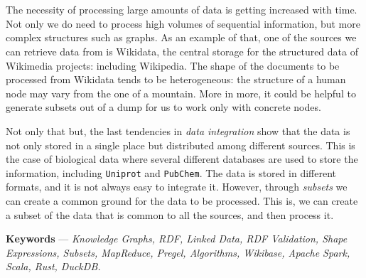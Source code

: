 \newenvironment{abstract}%
{\cleardoublepage\null\vfill\section*{\abstractname}}%
{\vfill\null}
\begin{abstract}
    The necessity of processing large amounts of data is getting increased with time. Not only we do need to process high volumes of sequential information, but more complex structures such as graphs. As an example of that, one of the sources we can retrieve data from is Wikidata, the central storage for the structured data of Wikimedia projects: including Wikipedia. The shape of the documents to be processed from Wikidata tends to be heterogeneous: the structure of a human node may vary from the one of a mountain. More in more, it could be helpful to generate subsets out of a dump for us to work only with concrete nodes.

    Not only that but, the last tendencies in \textit{data integration} show that the data is not only stored in a single place but distributed among different sources. This is the case of biological data where several different databases are used to store the information, including \texttt{Uniprot} and \texttt{PubChem}. The data is stored in different formats, and it is not always easy to integrate it. However, through \textit{subsets} we can create a common ground for the data to be processed. This is, we can create a subset of the data that is common to all the sources, and then process it.
\end{abstract}

\noindent \textbf{Keywords} --- \textit{Knowledge Graphs, RDF, Linked Data, RDF Validation, Shape Expressions, Subsets, MapReduce, Pregel, Algorithms, Wikibase, Apache Spark, Scala, Rust, DuckDB.}